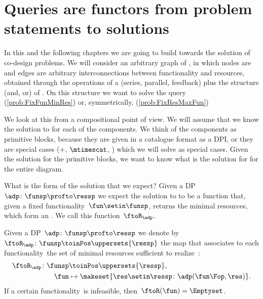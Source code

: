
\section{Queries are functors from problem statements to solutions}

In this and the following chapters we are going to build towards the solution of co-design problems.
We will consider an arbitrary graph of , in which nodes are  and edges are arbitrary interconnections between functionality and resources, obtained through the operations of a  (series, parallel, feedback) plus the  structure (and, or) of .
On this structure we want to solve the query \FixFunMinRes (\cref{prob:FixFunMinRes}) or, symmetrically, \FixResMaxFun (\cref{prob:FixResMaxFun})

We look at this from a compositional point of view.
We will assume that we know the solution to \FixFunMinRes for each of the components.
We think of the components as primitive blocks, because they are given in a catalogue format as a DPI, or they are special cases ($+$, $\mtimescat$, \etc) which we will solve as special cases.
Given the solution for the primitive blocks, we want to know what is the solution for \FixFunMinRes for the entire diagram.

What is the form of the solution that we expect?
Given a DP~$\adp\colon \funsp \profto \ressp$ we expect the solution to \FixFunMinRes to be a function that, given a fixed functionality~$\fun\setin\funsp$, returns the minimal resources, which form an .
We call this function~$\ftoR_\adp$.

\begin{definition}
    \label{def:ftoR-dp}
    Given a DP~$\adp\colon\funsp\profto\ressp$ we denote by~$\ftoR_{\adp}\colon \funsp\toinPos \uppersets{\ressp}$ the map that associates to each functionality~\fun the set of minimal resources sufficient to realize~\fun:
    \begin{equation}
        \begin{aligned}
            \ftoR_{\adp}\colon \funsp & \toinPos \uppersets{\ressp}, \\
            \fun                      & \mapsto \makeset{ \res \setin \ressp \colon \adp(\fun\Fop, \res)}.
        \end{aligned}
    \end{equation}
    If a certain functionality~\fun is infeasible, then~$\ftoR(\fun)=\Emptyset$.
\end{definition}

